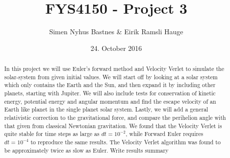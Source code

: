 \documentclass{article}
\title{FYS4150 - Project 3}
\author{Simen Nyhus Bastnes \& Eirik Ramsli Hauge}
\date{24. October 2016}
\newcommand{\husk}[1]{\color{red} #1 \color{black}}
\begin{document}
\maketitle
\begin{abstract}
In this project we will use Euler's forward method and Velocity Verlet to simulate the solar-system from given initial values. We will start off by looking at a solar system which only contains the Earth and the Sun, and then expand it by including other planets, starting with Jupiter. We will also include tests for conservation of kinetic energy, potential energy and angular momentum and find the escape velocity of an Earth like planet in the single planet solar system. Lastly, we will add a general relativistic correction to the gravitational force, and compare the perihelion angle with that given from classical Newtonian gravitation. We found that the Velocity Verlet is quite stable for time steps as large as $dt = 10^{-2}$, while Forward Euler requires $dt = 10^{-4}$ to reproduce the same results. The Velocity Verlet algorithm was found to be approximately twice as slow as Euler. \husk{Write results summary}
\end{abstract}
\end{document}
